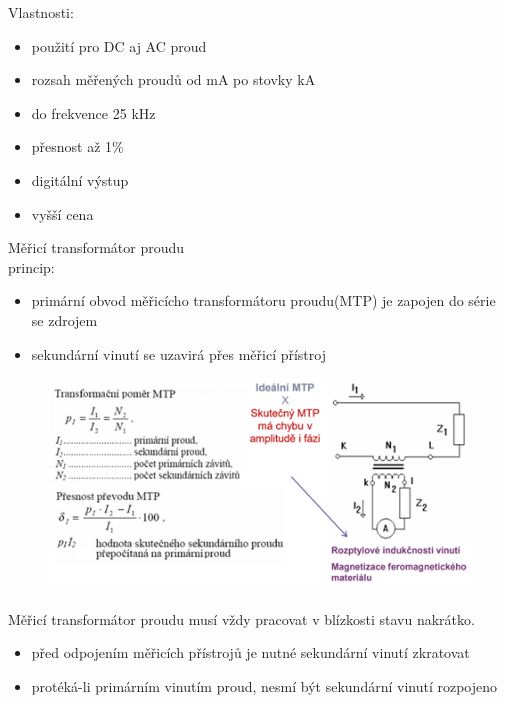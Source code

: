 Vlastnosti:
\begin{itemize}
    \item použití pro DC aj AC proud
    \item rozsah měřených proudů od mA po stovky kA 
    \item do frekvence 25 kHz
    \item přesnost až 1\%
    \item digitální výstup
    \item vyšší cena
\end{itemize}
\newpage
Měřicí transformátor proudu\\
princip:
\begin{itemize}
    \item primární obvod měřicícho transformátoru proudu(MTP) je zapojen do série se zdrojem
    \item sekundární vinutí se uzavirá přes měřicí přístroj
\end{itemize}
\begin{figure}[H]
    \includegraphics*[scale = 1.3]{images/proud_transformator.png}
\end{figure}

Měřicí transformátor proudu musí vždy pracovat v blízkosti stavu nakrátko.
\begin{itemize}
    \item před odpojením měřicích přístrojů je nutné sekundární vinutí zkratovat
    \item protéká-li primárním vinutím proud, nesmí být sekundární vinutí rozpojeno
\end{itemize}

